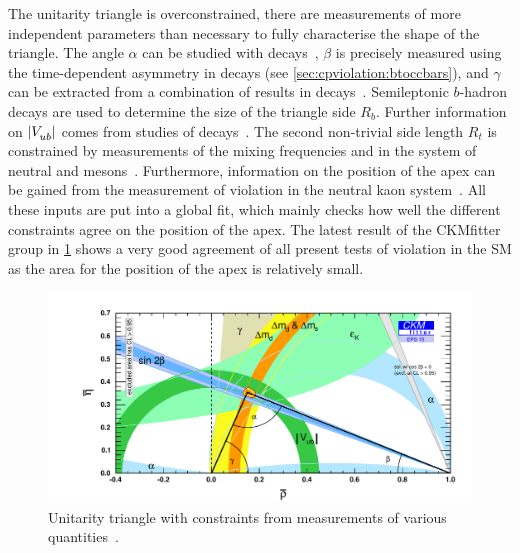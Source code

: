 The unitarity triangle is overconstrained, \ie there are measurements of more
independent parameters than necessary to fully characterise the shape of the
triangle. The angle $\alpha$ can be studied with \BdToPiPi
decays~\cite{BaBar_alpha,Belle_alpha,LHCb-PAPER-2013-040}, $\beta$ is
precisely measured using the time-dependent \CP asymmetry in \BdToJPsiKS
decays (see \cref{sec:cpviolation:btoccbars}), and $\gamma$ can be extracted
from a combination of results in \BToDh decays~\cite{LHCb-CONF-2016-001}.
Semileptonic $b$-hadron decays are used to determine the size of the triangle
side $R_b$. Further information on $|{V_{{u}{b}}^{}}|$ comes from studies of \BuToTauNu
decays~\cite{BaBar_BToTauNu,Belle_BToTauNu_HT,Belle_BToTauNu_SL}. The second
non-trivial side length $R_t$ is constrained by measurements of the mixing
frequencies \dmd and \dms in the system of neutral \Bd and \Bs
mesons~\cite{HFAG}. Furthermore, information on the position of the apex can
be gained from the measurement of \CP violation in the neutral kaon
system~\cite{PDG2016}. All these inputs are put into a global fit, which
mainly checks how well the different constraints agree on the position of the
apex. The latest result of the CKMfitter group in
\cref{fig:cpviolation:ckmtriangle_fitted} shows a very good agreement of all
present tests of \CP violation in the SM as the area for the position of the
apex is relatively small.
\begin{figure}
\centering
\includegraphics[width=\textwidth]{03-CPViolation/figs/CKMfitterTriangle.pdf}
\caption{Unitarity triangle with constraints from measurements of various
quantities~\cite{CKMfitter}.}
\label{fig:cpviolation:ckmtriangle_fitted}
\end{figure}
